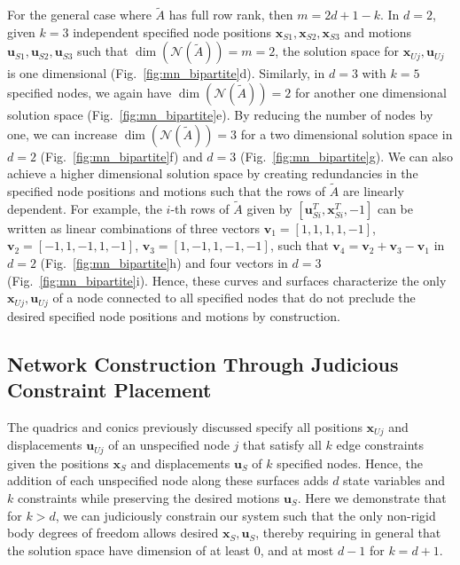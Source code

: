 \documentclass[%
preprint,
 amsmath,amssymb,
 aps,
]{revtex4-1}
\newcommand{\mc}{\mathcal}
\begin{document}
For the general case where $\tilde{A}$ has full row rank, then $m = 2d+1-k$. In $d=2$, given $k=3$ independent specified node positions $\bm{x}_{S1}, \bm{x}_{S2}, \bm{x}_{S3}$ and motions $\bm{u}_{S1}, \bm{u}_{S2}, \bm{u}_{S3}$ such that $\dim(\mc N(\tilde{A})) = m=2$, the solution space for $\bm{x}_{Uj},\bm{u}_{Uj}$ is one dimensional (Fig.~\ref{fig:mn_bipartite}d). Similarly, in $d=3$ with $k=5$ specified nodes, we again have $\dim(\mc N(\tilde{A})) = 2$ for another one dimensional solution space (Fig.~\ref{fig:mn_bipartite}e). By reducing the number of nodes by one, we can increase $\dim(\mc N(\tilde{A})) = 3$ for a two dimensional solution space in $d=2$ (Fig.~\ref{fig:mn_bipartite}f) and $d=3$ (Fig.~\ref{fig:mn_bipartite}g). We can also achieve a higher dimensional solution space by creating redundancies in the specified node positions and motions such that the rows of $\tilde{A}$ are linearly dependent. For example, the $i$-th rows of $\tilde{A}$ given by $[\bm{u}_{Si}^T, \bm{x}_{Si}^T, -1]$ can be written as linear combinations of three vectors $\bm{v}_1 = [1, 1, 1, 1, -1]$, $\bm{v}_2 = [-1, 1, -1, 1, -1]$, $\bm{v}_3 = [1, -1, 1, -1, -1]$, such that $\bm{v}_4 = \bm{v}_2 + \bm{v}_3 - \bm{v}_1$ in $d=2$ (Fig.~\ref{fig:mn_bipartite}h) and four vectors in $d=3$ (Fig.~\ref{fig:mn_bipartite}i). Hence, these curves and surfaces characterize the only $\bm{x}_{Uj},\bm{u}_{Uj}$ of a node connected to all specified nodes that do not preclude the desired specified node positions and motions by construction. 



\subsection{Network Construction Through Judicious Constraint Placement}

The quadrics and conics previously discussed specify all positions $\bm{x}_{Uj}$ and displacements $\bm{u}_{Uj}$ of an unspecified node $j$ that satisfy all $k$ edge constraints given the positions $\bm{x}_S$ and displacements $\bm{u}_S$ of $k$ specified nodes. Hence, the addition of each unspecified node along these surfaces adds $d$ state variables and $k$ constraints while preserving the desired motions $\bm{u}_S$. Here we demonstrate that for $k > d$, we can judiciously constrain our system such that the only non-rigid body degrees of freedom allows desired $\bm{x}_S, \bm{u}_S$, thereby requiring in general that the solution space have dimension of at least 0, and at most $d-1$ for $k = d+1$.
\end{document}
